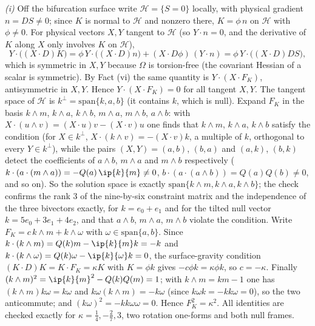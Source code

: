 \emph{(i)} Off the bifurcation surface write $\mathcal{H} = \{S = 0\}$ locally, with physical gradient $n = DS \ne 0$; since $K$ is normal to $\mathcal{H}$ and nonzero there, $K = \phi\,n$ on $\mathcal{H}$ with $\phi \ne 0$. For physical vectors $X, Y$ tangent to $\mathcal{H}$ (so $Y\cdot n = 0$, and the derivative of $K$ along $X$ only involves $K$ on $\mathcal{H}$),
\[
Y\cdot\bigl((X\cdot D)K\bigr) = \phi\,Y\cdot\bigl((X\cdot D)n\bigr) + (X\cdot D\phi)\,(Y\cdot n) = \phi\,Y\cdot\bigl((X\cdot D)DS\bigr),
\]
which is symmetric in $X, Y$ because $\Omega$ is torsion-free (the covariant Hessian of a scalar is symmetric). By Fact (vi) the same quantity is $Y\cdot(X\cdot F_{K})$, antisymmetric in $X, Y$. Hence $Y\cdot(X\cdot F_{K}) = 0$ for all tangent $X, Y$. The tangent space of $\mathcal{H}$ is $k^{\perp} = \mathrm{span}\{k, a, b\}$ (it contains $k$, which is null). Expand $F_{K}$ in the basis $k\wedge m$, $k\wedge a$, $k\wedge b$, $m\wedge a$, $m\wedge b$, $a\wedge b$: with $X\cdot(u\wedge v) = (X\cdot u)v - (X\cdot v)u$ one finds that $k\wedge m$, $k\wedge a$, $k\wedge b$ satisfy the condition (for $X \in k^{\perp}$, $X\cdot(k\wedge v) = -(X\cdot v)k$, a multiple of $k$, orthogonal to every $Y \in k^{\perp}$), while the pairs $(X, Y) = (a, b)$, $(b, a)$ and $(a, k)$, $(b, k)$ detect the coefficients of $a\wedge b$, $m\wedge a$ and $m\wedge b$ respectively ($k\cdot(a\cdot(m\wedge a)) = -Q(a)\,\ip{k}{m} \ne 0$, $b\cdot(a\cdot(a\wedge b)) = Q(a)Q(b) \ne 0$, and so on). So the solution space is exactly $\mathrm{span}\{k\wedge m, k\wedge a, k\wedge b\}$; the check confirms the rank $3$ of the nine-by-six constraint matrix and the independence of the three bivectors exactly, for $k = e_{0} + e_{1}$ and for the tilted null vector $k = 5e_{0} + 3e_{1} + 4e_{2}$, and that $a\wedge b$, $m\wedge a$, $m\wedge b$ violate the condition. Write $F_{K} = c\,k\wedge m + k\wedge\omega$ with $\omega \in \mathrm{span}\{a, b\}$. Since $k\cdot(k\wedge m) = Q(k)m - \ip{k}{m}k = -k$ and $k\cdot(k\wedge\omega) = Q(k)\omega - \ip{k}{\omega}k = 0$, the surface-gravity condition $(K\cdot D)K = K\cdot F_{K} = \kappa K$ with $K = \phi k$ gives $-c\phi k = \kappa\phi k$, so $c = -\kappa$. Finally $(k\wedge m)^{2} = \ip{k}{m}^{2} - Q(k)Q(m) = 1$; with $k\wedge m = km - 1$ one has $(k\wedge m)k\omega = k\omega$ and $k\omega(k\wedge m) = -k\omega$ (since $k\omega k = -kk\omega = 0$), so the two anticommute; and $(k\omega)^{2} = -kk\omega\omega = 0$. Hence $F_{K}^{2} = \kappa^{2}$. All identities are checked exactly for $\kappa = \tfrac14, -\tfrac27, 3$, two rotation one-forms and both null frames.

